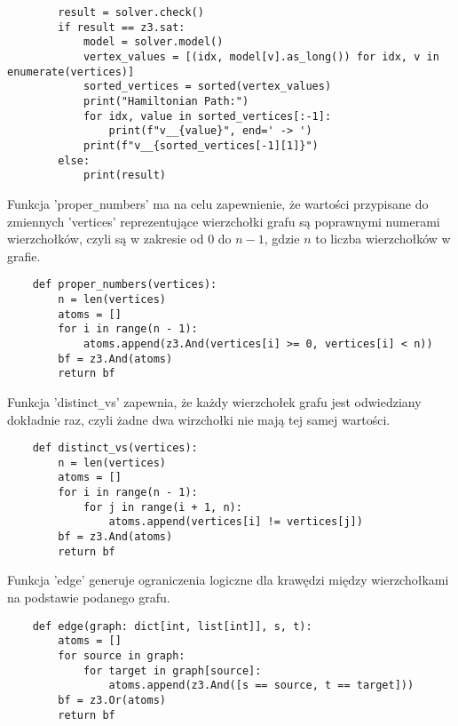 \begin{lstlisting}
		result = solver.check()
		if result == z3.sat:
			model = solver.model()
			vertex_values = [(idx, model[v].as_long()) for idx, v in enumerate(vertices)]
			sorted_vertices = sorted(vertex_values)
			print("Hamiltonian Path:")
			for idx, value in sorted_vertices[:-1]:
				print(f"v__{value}", end=' -> ')
			print(f"v__{sorted_vertices[-1][1]}")
		else:
			print(result)
\end{lstlisting}
\vspace{1cm}

Funkcja 'proper\verb|_|numbers' ma na celu zapewnienie, że wartości przypisane do zmiennych 'vertices' reprezentujące wierzchołki grafu są poprawnymi numerami wierzchołków, czyli są w zakresie od $0$ do $n - 1$, gdzie $n$ to liczba wierzchołków w grafie.

\begin{lstlisting}
	def proper_numbers(vertices):
		n = len(vertices)
		atoms = []
		for i in range(n - 1):
			atoms.append(z3.And(vertices[i] >= 0, vertices[i] < n))
		bf = z3.And(atoms)
		return bf
\end{lstlisting}
\vspace{1cm}

Funkcja 'distinct\verb|_|vs' zapewnia, że każdy wierzchołek grafu jest odwiedziany dokładnie raz, czyli żadne dwa wirzchołki nie mają tej samej wartości. 
		
\begin{lstlisting}	
	def distinct_vs(vertices):
		n = len(vertices)
		atoms = []
		for i in range(n - 1):
			for j in range(i + 1, n):
				atoms.append(vertices[i] != vertices[j])
		bf = z3.And(atoms)
		return bf
\end{lstlisting}
\vspace{1cm}

Funkcja 'edge' generuje ograniczenia logiczne dla krawędzi między wierzchołkami na podstawie podanego grafu.
	
\begin{lstlisting}	
	def edge(graph: dict[int, list[int]], s, t):
		atoms = []
		for source in graph:
			for target in graph[source]:
				atoms.append(z3.And([s == source, t == target]))
		bf = z3.Or(atoms)
		return bf
\end{lstlisting}